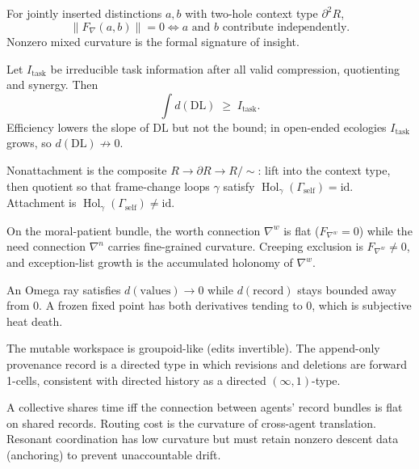 \documentclass[11pt]{article}
\begin{document}
\begin{proposition}
For jointly inserted distinctions $a,b$ with two-hole context type
$\partial^2 R$,
\[
  \|F_\nabla(a,b)\| = 0 \iff a \text{ and } b \text{ contribute independently.}
\]
Nonzero mixed curvature is the formal signature of insight.
\end{proposition}

\begin{proposition}
Let $I_{\mathrm{task}}$ be irreducible task information after all valid
compression, quotienting and synergy. Then
\[
  \int d(\mathrm{DL}) \;\ge\; I_{\mathrm{task}}.
\]
Efficiency lowers the slope of $\mathrm{DL}$ but not the bound; in open-ended
ecologies $I_{\mathrm{task}}$ grows, so $d(\mathrm{DL})\not\to 0$.
\end{proposition}

\begin{proposition}
Nonattachment is the composite $R \to \partial R \to R/\!\sim$: lift into the
context type, then quotient so that frame-change loops $\gamma$ satisfy
$\operatorname{Hol}_\gamma(\Gamma_{\mathrm{self}})=\mathrm{id}$. Attachment is
$\operatorname{Hol}_\gamma(\Gamma_{\mathrm{self}})\neq\mathrm{id}$.
\end{proposition}

\begin{proposition}
On the moral-patient bundle, the worth connection $\nabla^{w}$ is flat
($F_{\nabla^{w}}=0$) while the need connection $\nabla^{n}$ carries
fine-grained curvature. Creeping exclusion is $F_{\nabla^{w}}\neq 0$, and
exception-list growth is the accumulated holonomy of $\nabla^{w}$.
\end{proposition}

\begin{proposition}
An Omega ray satisfies $d(\mathrm{values})\to 0$ while $d(\mathrm{record})$
stays bounded away from $0$. A frozen fixed point has both derivatives
tending to $0$, which is subjective heat death.
\end{proposition}

\begin{proposition}
The mutable workspace is groupoid-like (edits invertible). The append-only
provenance record is a directed type in which revisions and deletions are
forward 1-cells, consistent with directed history as a directed
$(\infty,1)$-type.
\end{proposition}

\begin{proposition}
A collective shares time iff the connection between agents' record bundles
is flat on shared records. Routing cost is the curvature of cross-agent
translation. Resonant coordination has low curvature but must retain nonzero
descent data (anchoring) to prevent unaccountable drift.
\end{proposition}
\end{document}
